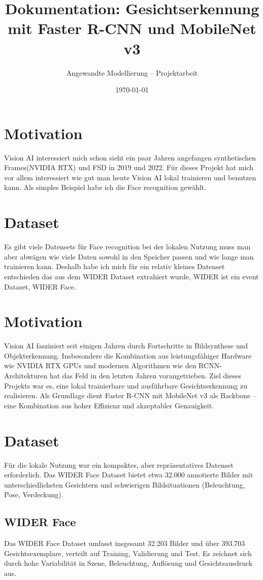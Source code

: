 \documentclass[11pt,a4paper]{article}
\title{\textbf{Dokumentation: Gesichtserkennung mit Faster R-CNN und MobileNet v3}}
\author{Angewandte Modellierung – Projektarbeit}
\date{\today}
\begin{document}
\maketitle

\tableofcontents
\newpage



\section{Motivation}
Vision AI interessiert mich schon sieht ein paar Jahren angefangen synthetischen Frames(NVIDIA RTX) und FSD in 2019 und 2022. Für dieses Projekt hat mich vor allem interessiert wie gut man heute Vision AI lokal trainieren und benutzen kann. Als simples Beispiel habe ich die Face recognition gewählt.

\section{Dataset}
Es gibt viele Datensets für Face recognition bei der lokalen Nutzung muss man aber abwägen wie viele Daten sowohl in den Speicher passen und wie lange man trainieren kann. Deshalb habe ich mich für ein relativ kleines Datenset entschieden das aus dem WIDER Dataset extrahiert wurde, WIDER ist ein event Dataset, WIDER Face.

\section{Motivation}
Vision AI fasziniert seit einigen Jahren durch Fortschritte in Bildsynthese und Objekterkennung. Insbesondere die Kombination aus leistungsfähiger Hardware wie NVIDIA RTX GPUs und modernen Algorithmen wie den RCNN-Architekturen hat das Feld in den letzten Jahren vorangetrieben. Ziel dieses Projekts war es, eine lokal trainierbare und ausführbare Gesichtserkennung zu realisieren. Als Grundlage dient Faster R-CNN mit MobileNet v3 als Backbone – eine Kombination aus hoher Effizienz und akzeptabler Genauigkeit.

\section{Dataset}
Für die lokale Nutzung war ein kompaktes, aber repräsentatives Datenset erforderlich. Das WIDER Face Dataset bietet etwa 32.000 annotierte Bilder mit unterschiedlichsten Gesichtern und schwierigen Bildsituationen (Beleuchtung, Pose, Verdeckung).

\subsection{WIDER Face}
Das WIDER Face Dataset umfasst insgesamt 32.203 Bilder und über 393.703 Gesichtsexemplare, verteilt auf Training, Validierung und Test. Es zeichnet sich durch hohe Variabilität in Szene, Beleuchtung, Auflösung und Gesichtsausdruck aus.
\end{document}
